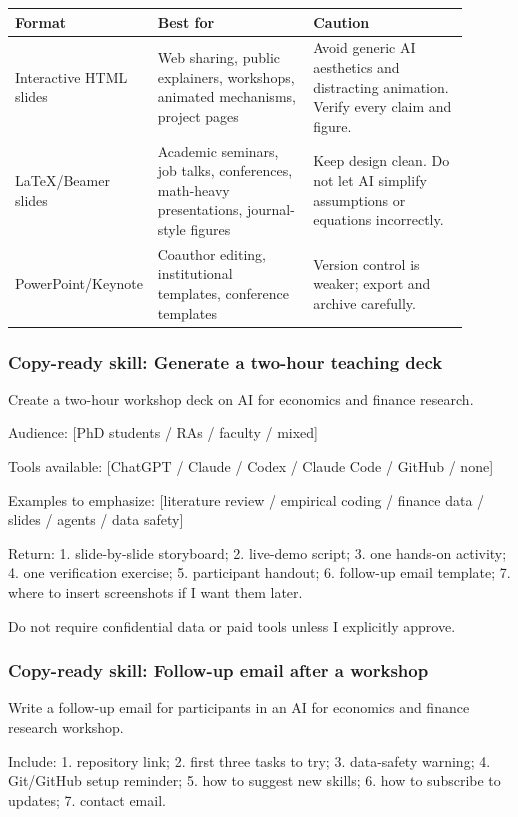 \documentclass[11pt]{article}
\newcommand{\skill}[1]{\subsubsection*{Copy-ready skill: #1}}
\begin{document}
\begin{longtable}{p{0.22\linewidth}p{0.34\linewidth}p{0.34\linewidth}}
\toprule
\textbf{Format} & \textbf{Best for} & \textbf{Caution}\\
\midrule
Interactive HTML slides & Web sharing, public explainers, workshops, animated mechanisms, project pages & Avoid generic AI aesthetics and distracting animation. Verify every claim and figure.\\
LaTeX/Beamer slides & Academic seminars, job talks, conferences, math-heavy presentations, journal-style figures & Keep design clean. Do not let AI simplify assumptions or equations incorrectly.\\
PowerPoint/Keynote & Coauthor editing, institutional templates, conference templates & Version control is weaker; export and archive carefully.\\
\bottomrule
\end{longtable}

\skill{Generate a two-hour teaching deck}

\begin{promptblock}
Create a two-hour workshop deck on AI for economics and finance research.

Audience:
[PhD students / RAs / faculty / mixed]

Tools available:
[ChatGPT / Claude / Codex / Claude Code / GitHub / none]

Examples to emphasize:
[literature review / empirical coding / finance data / slides / agents / data safety]

Return:
1. slide-by-slide storyboard;
2. live-demo script;
3. one hands-on activity;
4. one verification exercise;
5. participant handout;
6. follow-up email template;
7. where to insert screenshots if I want them later.

Do not require confidential data or paid tools unless I explicitly approve.
\end{promptblock}

\skill{Follow-up email after a workshop}

\begin{promptblock}
Write a follow-up email for participants in an AI for economics and finance
research workshop.

Include:
1. repository link;
2. first three tasks to try;
3. data-safety warning;
4. Git/GitHub setup reminder;
5. how to suggest new skills;
6. how to subscribe to updates;
7. contact email.
\end{promptblock}
\end{document}
